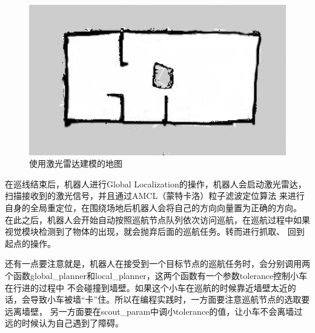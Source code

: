 \documentclass[a4paper,twoside]{article}
\begin{document}
\begin{figure}[htbp]
	\begin{center}
		\includegraphics*[width=0.65\linewidth]{map.png}
		\caption{使用激光雷达建模的地图}\label{map}
	\end{center}
\end{figure}
在巡线结束后，机器人进行Global Localization的操作，机器人会启动激光雷达，扫描接收到的激光信号，并且通过AMCL（蒙特卡洛）粒子滤波定位算法
来进行自身的全局重定位，在围绕场地后机器人会将自己的方向向量置为正确的方向。
在此之后，机器人会开始自动按照巡航节点队列依次访问巡航，在巡航过程中如果视觉模块检测到了物体的出现，就会抛弃后面的巡航任务。转而进行抓取、
回到起点的操作。

还有一点要注意就是，机器人在接受到一个目标节点的巡航任务时，会分别调用两个函数global\_planner和local\_planner，这两个函数有一个参数tolerance控制小车在行进的过程中
不会碰撞到墙壁。如果这个小车在巡航的时候靠近墙壁太近的话，会导致小车被墙“卡”住。所以在编程实践时，一方面要注意巡航节点的选取要远离墙壁，
另一方面要在scout\_param中调小tolerance的值，让小车不会离墙过远的时候认为自己遇到了障碍。
\end{document}

